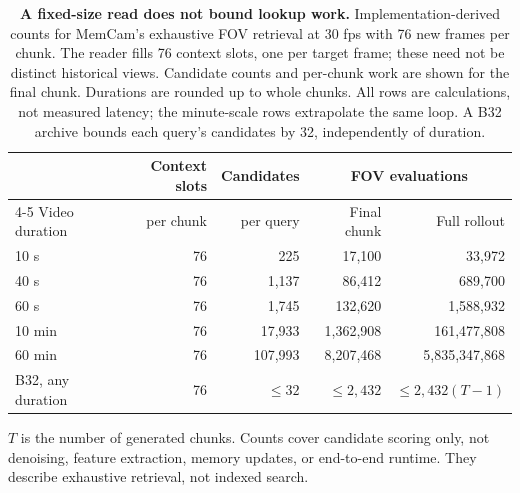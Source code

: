 \begin{table}[t]
\centering
\small
\caption{\textbf{A fixed-size read does not bound lookup work.}
Implementation-derived counts for MemCam's exhaustive FOV retrieval at 30 fps
with 76 new frames per chunk. The reader fills 76 context slots, one per target
frame; these need not be distinct historical views. Candidate counts and
per-chunk work are shown for the final chunk. Durations are rounded up to whole
chunks. All rows are calculations, not measured latency; the minute-scale
rows extrapolate the same loop. A B32 archive bounds each query's candidates
by 32, independently of duration.}
\label{tab:lookup-scaling}
\setlength{\tabcolsep}{7pt}
\begin{tabular}{lrrrr}
\toprule
& Context slots & Candidates & \multicolumn{2}{c}{FOV evaluations} \\
\cmidrule(lr){4-5}
Video duration & per chunk & per query & Final chunk & Full rollout \\
\midrule
10 s   & 76 & 225     & 17,100    & 33,972 \\
40 s   & 76 & 1,137   & 86,412    & 689,700 \\
60 s   & 76 & 1,745   & 132,620   & 1,588,932 \\
10 min & 76 & 17,933  & 1,362,908 & 161,477,808 \\
60 min & 76 & 107,993 & 8,207,468 & 5,835,347,868 \\
\midrule
B32, any duration & 76 & $\leq32$ & $\leq2,432$ & $\leq2,432(T-1)$ \\
\bottomrule
\end{tabular}

\vspace{2pt}
\parbox{0.96\textwidth}{\footnotesize
$T$ is the number of generated chunks. Counts cover candidate scoring only,
not denoising, feature extraction, memory updates, or end-to-end runtime.
They describe exhaustive retrieval, not indexed search.}
\end{table}
